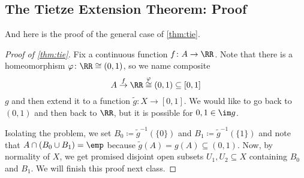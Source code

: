 \documentclass[../notes.tex]{subfiles}
\begin{document}
\subsection{The Tietze Extension Theorem: Proof}
And here is the proof of the general case of \autoref{thm:tie}.
\begin{proof}[Proof of \autoref{thm:tie}]
	Fix a continuous function $f\colon A\to\RR$. Note that there is a homeomorphism $\varphi\colon\RR\cong(0,1)$, so we name composite
	\[A\stackrel f\to\RR\stackrel\varphi\cong(0,1)\subseteq[0,1]\]
	$g$ and then extend it to a function $\widetilde g\colon X\to[0,1]$. We would like to go back to $(0,1)$ and then back to $\RR$, but it is possible for $0,1\in\im g$.

	Isolating the problem, we set $B_0\coloneqq\widetilde g^{-1}(\{0\})$ and $B_1\coloneqq\widetilde g^{-1}(\{1\})$ and note that $A\cap (B_0\cup B_1)=\emp$ because $\widetilde g(A)=g(A)\subseteq(0,1)$. Now, by normality of $X$, we get promised disjoint open subsets $U_1,U_2\subseteq X$ containing $B_0$ and $B_1$. We will finish this proof next class.
\end{proof}
\end{document}

